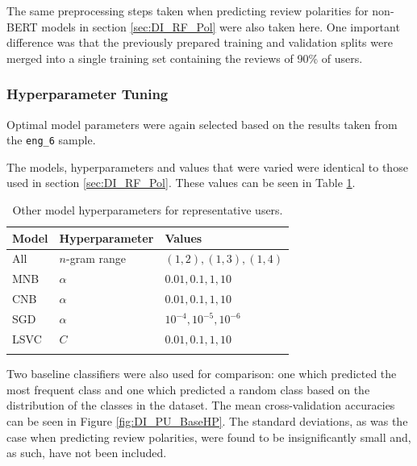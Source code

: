 The same preprocessing steps taken when predicting review polarities for non-BERT models in section \ref{sec:DI_RF_Pol} were also taken here. One important difference was that the previously prepared training and validation splits were merged into a single training set containing the reviews of 90\% of users.

\subsubsection{Hyperparameter Tuning}

Optimal model parameters were again selected based on the results taken from the \texttt{eng\_6} sample.

The models, hyperparameters and values that were varied were identical to those used in section \ref{sec:DI_RF_Pol}. These values can be seen in Table \ref{tab:DI_PU_BaseHP}.

\begin{table}[ht]
    \centering
    \begin{tabular}{l l l}
        \toprule
        \textbf{Model} & \textbf{Hyperparameter} & \textbf{Values}\\\midrule
        All & $n$-gram range & $(1, 2), (1, 3), (1, 4)$\\
        MNB & $\alpha$ & $0.01, 0.1, 1, 10$\\
        CNB & $\alpha$ & $0.01, 0.1, 1, 10$\\
        SGD & $\alpha$ & $10^{-4}, 10^{-5}, 10^{-6}$\\
        LSVC & $C$ & $0.01, 0.1, 1, 10$\\
        \bottomrule\\
    \end{tabular}
    \caption{Other model hyperparameters for representative users.}
    \label{tab:DI_PU_BaseHP}
\end{table}

Two baseline classifiers were also used for comparison: one which predicted the most frequent class and one which predicted a random class based on the distribution of the classes in the dataset. The mean cross-validation accuracies can be seen in Figure \ref{fig:DI_PU_BaseHP}. The standard deviations, as was the case when predicting review polarities, were found to be insignificantly small and, as such, have not been included.

